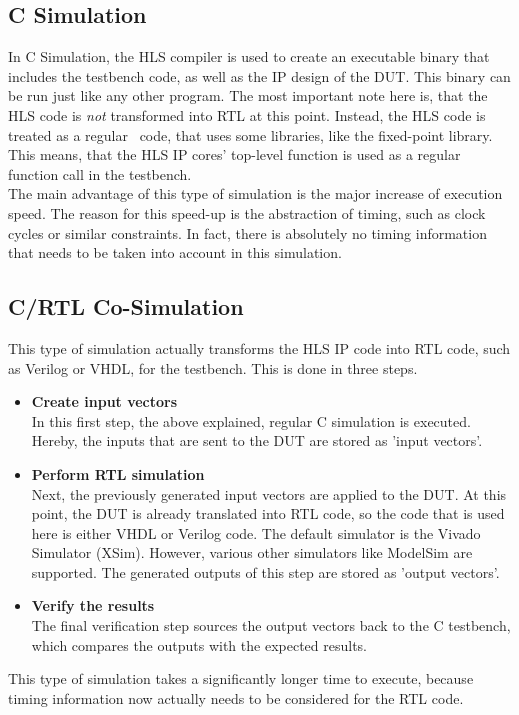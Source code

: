 \subsection{C Simulation}

In C Simulation, the HLS compiler is used to create an executable binary that includes the testbench code, as well as the IP design of the DUT.
This binary can be run just like any other program.
The most important note here is, that the HLS code is \textit{not} transformed into RTL at this point.
Instead, the HLS code is treated as a regular \cplusplus\ code, that uses some libraries, like the fixed-point library.
This means, that the HLS IP cores' top-level function is used as a regular function call in the testbench.\\

The main advantage of this type of simulation is the major increase of execution speed.
The reason for this speed-up is the abstraction of timing, such as clock cycles or similar constraints.
In fact, there is absolutely no timing information that needs to be taken into account in this simulation.

\subsection{C/RTL Co-Simulation}

This type of simulation actually transforms the HLS IP code into RTL code, such as Verilog or VHDL, for the testbench.
This is done in three steps.\\

\begin{itemize}
  \item \textbf{Create input vectors}\\
  In this first step, the above explained, regular C simulation is executed.
  Hereby, the inputs that are sent to the DUT are stored as 'input vectors'.

  \item \textbf{Perform RTL simulation}\\
  Next, the previously generated input vectors are applied to the DUT.
  At this point, the DUT is already translated into RTL code, so the code that is used here is either VHDL or Verilog code.
  The default simulator is the Vivado Simulator (XSim).
  However, various other simulators like ModelSim are supported.
  The generated outputs of this step are stored as 'output vectors'.
  \item \textbf{Verify the results}\\
  The final verification step sources the output vectors back to the C testbench, which compares the outputs with the expected results.\\
\end{itemize}

\noindent
This type of simulation takes a significantly longer time to execute, because timing information now actually needs to be considered for the RTL code.
